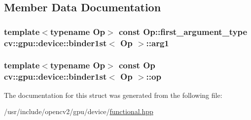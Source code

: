 \subsection{Member Data Documentation}
\hypertarget{structcv_1_1gpu_1_1device_1_1binder1st_a3655c7e6384979edd669b95bd63c0a3b}{
\subsubsection[{arg1}]{\setlength{\rightskip}{0pt plus 5cm}template$<$typename Op$>$ const Op\-::first\-\_\-argument\-\_\-type {\bf cv\-::gpu\-::device\-::binder1st}$<$ Op $>$\-::arg1}}\label{structcv_1_1gpu_1_1device_1_1binder1st_a3655c7e6384979edd669b95bd63c0a3b}
\hypertarget{structcv_1_1gpu_1_1device_1_1binder1st_a4fd65cab8767cd0ceae2be404d208b7d}{
\subsubsection[{op}]{\setlength{\rightskip}{0pt plus 5cm}template$<$typename Op$>$ const Op {\bf cv\-::gpu\-::device\-::binder1st}$<$ Op $>$\-::op}}\label{structcv_1_1gpu_1_1device_1_1binder1st_a4fd65cab8767cd0ceae2be404d208b7d}


The documentation for this struct was generated from the following file\-:\begin{DoxyCompactItemize}
\item 
/usr/include/opencv2/gpu/device/\hyperlink{functional_8hpp}{functional.\-hpp}\end{DoxyCompactItemize}
